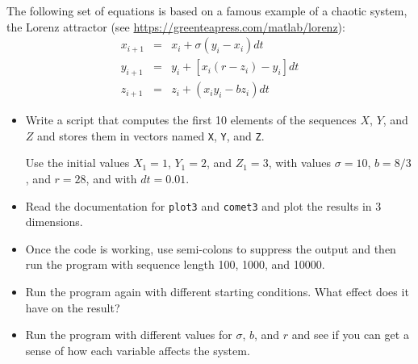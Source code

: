 \begin{ex}
  The following set of equations is based on a famous example of a chaotic system, the Lorenz attractor (see \url{https://greenteapress.com/matlab/lorenz}):
%
\begin{eqnarray}
x_{i+1} &=& x_i + \sigma \left( y_i - x_i \right) dt  \\
y_{i+1} &=& y_i + \left[ x_i (r - z_i) - y_i \right] dt   \\
z_{i+1} &=& z_i + \left( x_i y_i - b z_i \right) dt
\end{eqnarray}
%
\begin{itemize}

\item Write a script that computes the first 10 elements of the sequences
$X$, $Y$, and $Z$ and stores them in vectors named {\tt X}, {\tt Y},
and {\tt Z}.

Use the initial values $X_1 = 1$, $Y_1 = 2$, and $Z_1 = 3$, with values
$\sigma = 10$, $b = 8/3$, and $r = 28$, and with $dt = 0.01$.

\item Read the documentation for {\tt plot3} and {\tt comet3} and
plot the results in 3 dimensions.

\item Once the code is working, use semi-colons to suppress the output
and then run the program with sequence length 100, 1000, and 10000.

\item Run the program again with different starting conditions.
What effect does it have on the result?

\item Run the program with different values for $\sigma$, $b$, and $r$
and see if you can get a sense of how each variable affects the
system.

\end{itemize}

\end{ex}


